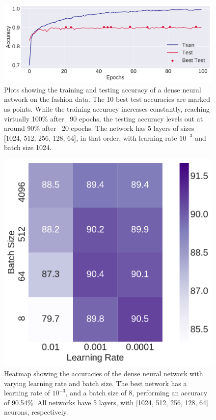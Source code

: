 \documentclass[10pt, twocolumn]{article}
\begin{document}
\begin{figure}[H]
    \centering
    \includegraphics[scale=0.4]{../figs/DNN_epochs.pdf}
    \caption{Plots showing the training and testing accuracy of a dense neural network on the fashion data. The 10 best test accuracies are marked as points. While the training accuracy increases constantly, reaching virtually 100\% after ~90 epochs, the testing accuracy levels out at around 90\% after ~20 epochs. The network has 5 layers of sizes [1024, 512, 256, 128, 64], in that order, with learning rate $10^{-3}$ and batch size 1024.}
    \label{fig:DNN_epochs}
\end{figure}

\begin{figure}[H]
    \centering
    \includegraphics[scale=0.4]{../figs/DNN_lr_batchsize_heatmap.pdf}
    \caption{Heatmap showing the accuracies of the dense neural network with varying learning rate and batch size. The best network has a learning rate of $10^{-3}$, and a batch size of 8, performing an accuracy of 90.54\%. All networks have 5 layers, with [1024, 512, 256, 128, 64] neurons, respectively.}
    \label{fig:DNN_hp1}
\end{figure}
\end{document}

